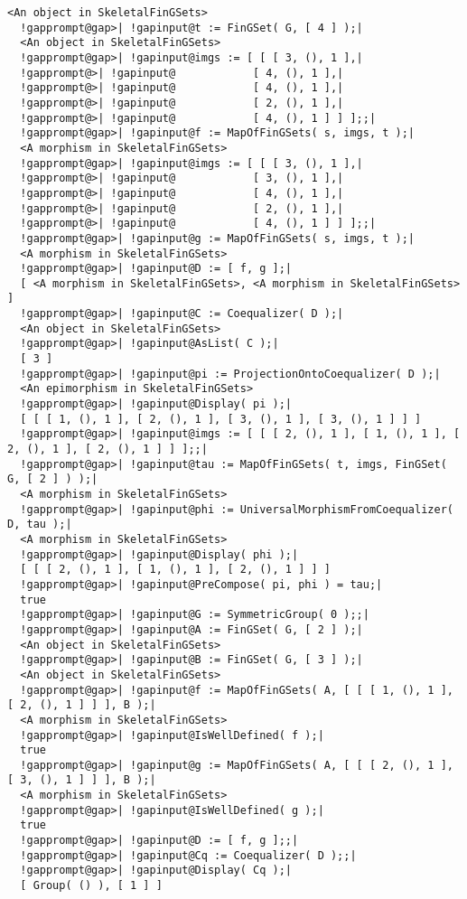 \documentclass[a4paper,11pt]{report}
\begin{document}
{{{\begin{Verbatim}[commandchars=!@|,fontsize=\small,frame=single,label=Example]
  <An object in SkeletalFinGSets>
  !gapprompt@gap>| !gapinput@t := FinGSet( G, [ 4 ] );|
  <An object in SkeletalFinGSets>
  !gapprompt@gap>| !gapinput@imgs := [ [ [ 3, (), 1 ],|
  !gapprompt@>| !gapinput@            [ 4, (), 1 ],|
  !gapprompt@>| !gapinput@            [ 4, (), 1 ],|
  !gapprompt@>| !gapinput@            [ 2, (), 1 ],|
  !gapprompt@>| !gapinput@            [ 4, (), 1 ] ] ];;|
  !gapprompt@gap>| !gapinput@f := MapOfFinGSets( s, imgs, t );|
  <A morphism in SkeletalFinGSets>
  !gapprompt@gap>| !gapinput@imgs := [ [ [ 3, (), 1 ],|
  !gapprompt@>| !gapinput@            [ 3, (), 1 ],|
  !gapprompt@>| !gapinput@            [ 4, (), 1 ],|
  !gapprompt@>| !gapinput@            [ 2, (), 1 ],|
  !gapprompt@>| !gapinput@            [ 4, (), 1 ] ] ];;|
  !gapprompt@gap>| !gapinput@g := MapOfFinGSets( s, imgs, t );|
  <A morphism in SkeletalFinGSets>
  !gapprompt@gap>| !gapinput@D := [ f, g ];|
  [ <A morphism in SkeletalFinGSets>, <A morphism in SkeletalFinGSets> ]
  !gapprompt@gap>| !gapinput@C := Coequalizer( D );|
  <An object in SkeletalFinGSets>
  !gapprompt@gap>| !gapinput@AsList( C );|
  [ 3 ]
  !gapprompt@gap>| !gapinput@pi := ProjectionOntoCoequalizer( D );|
  <An epimorphism in SkeletalFinGSets>
  !gapprompt@gap>| !gapinput@Display( pi );|
  [ [ [ 1, (), 1 ], [ 2, (), 1 ], [ 3, (), 1 ], [ 3, (), 1 ] ] ]
  !gapprompt@gap>| !gapinput@imgs := [ [ [ 2, (), 1 ], [ 1, (), 1 ], [ 2, (), 1 ], [ 2, (), 1 ] ] ];;|
  !gapprompt@gap>| !gapinput@tau := MapOfFinGSets( t, imgs, FinGSet( G, [ 2 ] ) );|
  <A morphism in SkeletalFinGSets>
  !gapprompt@gap>| !gapinput@phi := UniversalMorphismFromCoequalizer( D, tau );|
  <A morphism in SkeletalFinGSets>
  !gapprompt@gap>| !gapinput@Display( phi );|
  [ [ [ 2, (), 1 ], [ 1, (), 1 ], [ 2, (), 1 ] ] ]
  !gapprompt@gap>| !gapinput@PreCompose( pi, phi ) = tau;|
  true
  !gapprompt@gap>| !gapinput@G := SymmetricGroup( 0 );;|
  !gapprompt@gap>| !gapinput@A := FinGSet( G, [ 2 ] );|
  <An object in SkeletalFinGSets>
  !gapprompt@gap>| !gapinput@B := FinGSet( G, [ 3 ] );|
  <An object in SkeletalFinGSets>
  !gapprompt@gap>| !gapinput@f := MapOfFinGSets( A, [ [ [ 1, (), 1 ], [ 2, (), 1 ] ] ], B );|
  <A morphism in SkeletalFinGSets>
  !gapprompt@gap>| !gapinput@IsWellDefined( f );|
  true
  !gapprompt@gap>| !gapinput@g := MapOfFinGSets( A, [ [ [ 2, (), 1 ], [ 3, (), 1 ] ] ], B );|
  <A morphism in SkeletalFinGSets>
  !gapprompt@gap>| !gapinput@IsWellDefined( g );|
  true
  !gapprompt@gap>| !gapinput@D := [ f, g ];;|
  !gapprompt@gap>| !gapinput@Cq := Coequalizer( D );;|
  !gapprompt@gap>| !gapinput@Display( Cq );|
  [ Group( () ), [ 1 ] ]

\end{Verbatim}}}}
\end{document}

